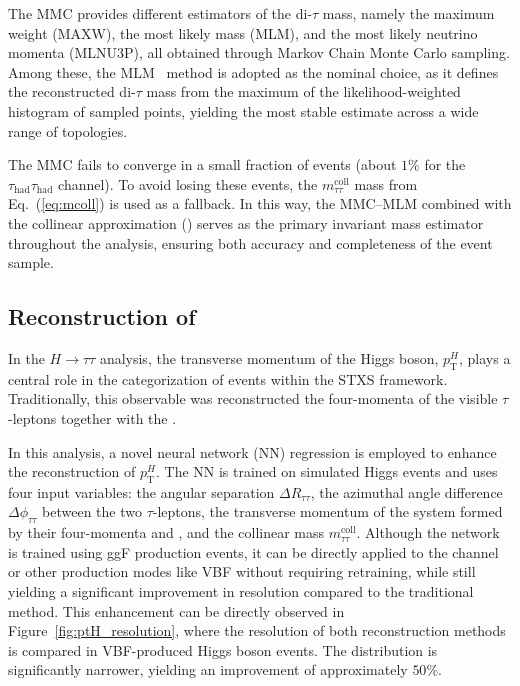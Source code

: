The MMC provides different estimators of the di-$\tau$ mass, namely the maximum weight (MAXW), the most likely mass (MLM), and the most likely neutrino momenta (MLNU3P), all obtained through Markov Chain Monte Carlo sampling. Among these, the MLM~\cite{mlm_thesis} method is adopted as the nominal choice, as it defines the reconstructed di-$\tau$ mass from the maximum of the likelihood-weighted histogram of sampled points, yielding the most stable estimate across a wide range of topologies.  

The MMC fails to converge in a small fraction of events (about $1\%$ for the $\tau_{\text{had}}\tau_{\text{had}}$ channel). To avoid losing these events, the $m_{\tau\tau}^{\text{coll}}$ mass from Eq.~(\ref{eq:mcoll}) is used as a fallback. In this way, the MMC–MLM combined with the collinear approximation (\mmc) serves as the primary invariant mass estimator throughout the analysis, ensuring both accuracy and completeness of the event sample. 

\subsection{Reconstruction of \pth}
\label{subsec:higgs_mass}

In the $H \to \tau\tau$ analysis, the transverse momentum of the Higgs boson, $p_{\text{T}}^H$, plays a central role in the categorization of events within the STXS framework. Traditionally, this observable was reconstructed the four-momenta of the visible $\tau$-leptons together with the \etmiss.

In this analysis, a novel neural network (NN) regression is employed to enhance the reconstruction of $p_{\text{T}}^H$. The NN is trained on simulated Higgs events and uses four input variables: the angular separation $\Delta R_{\tau\tau}$, the azimuthal angle difference $\Delta \phi_{\tau\tau}$ between the two $\tau$-leptons, the transverse momentum of the system formed by their four-momenta and \etmiss, and the collinear mass $m_{\tau\tau}^{\text{coll}}$. Although the network is trained using ggF production events, it can be directly applied to the \ttHtt channel or other production modes like VBF without requiring retraining, while still yielding a significant improvement in resolution compared to the traditional method.
This enhancement can be directly observed in Figure~\ref{fig:ptH_resolution}, where the resolution of both reconstruction methods is compared in VBF-produced Higgs boson events. The distribution is significantly narrower, yielding an improvement of approximately $50\%$.

